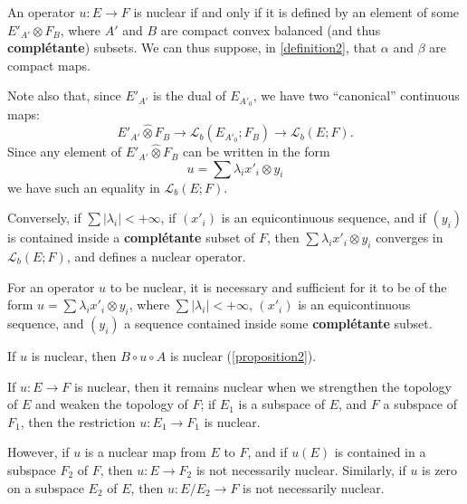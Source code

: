 \documentclass{article}
\theoremstyle{plain}
\newenvironment{proposition}[1]
    {\renewcommand\theinnercustomproposition{#1}\innercustomproposition}
    {\endinnercustomproposition}
\newenvironment{corollary}[1]
    {\renewcommand\theinnercustomcorollary{#1}\innercustomcorollary}
    {\endinnercustomcorollary}
\theoremstyle{definition}
\newcommand{\LL}{\mathcal{L}}
\newcommand{\cotimes}{\widehat{\otimes}}
\newcommand{\oldpage}[1]{\marginpar{\footnotesize$\Big\vert$ \textit{p.~#1}}}
\begin{document}
\begin{proposition}{3}
\label{proposition3}
  An operator $u\colon E\to F$ is nuclear if and only if it is defined by an element of some $E'_{A'}\otimes F_B$, where $A'$ and $B$ are compact convex balanced (and thus \textbf{compl\'{e}tante}) subsets.
  We can thus suppose, in \cref{definition2}, that $\alpha$ and $\beta$ are compact maps.
\end{proposition}

Note also that, since $E'_{A'}$ is the dual of $E_{A'_0}$, we have two ``canonical'' continuous maps:
\[
  E'_{A'}\cotimes F_B \to \LL_b(E_{A'_0};F_B) \to \LL_b(E;F).
\]
Since any element of $E'_{A'}\cotimes F_B$ can be written in the form
\[
  u = \sum\lambda_i x'_i\otimes y_i
\]
\oldpage{5}
we have such an equality in $\LL_b(E;F)$.

Conversely, if $\sum|\lambda_i|<+\infty$, if $(x'_i)$ is an equicontinuous sequence, and if $(y_i)$ is contained inside a \textbf{compl\'{e}tante} subset of $F$, then $\sum\lambda_i x'_i\otimes y_i$ converges in $\LL_b(E;F)$, and defines a nuclear operator.

\begin{proposition}{4}
\label{proposition4}
  For an operator $u$ to be nuclear, it is necessary and sufficient for it to be of the form $u=\sum\lambda_i x'_i\otimes y_i$, where $\sum|\lambda_i|<+\infty$, $(x'_i)$ is an equicontinuous sequence, and $(y_i)$ a sequence contained inside some \textbf{compl\'{e}tante} subset.
\end{proposition}

\begin{proposition}{5}
\label{proposition5}
  If $u$ is nuclear, then $B\circ u\circ A$ is nuclear (\cref{proposition2}).
\end{proposition}

\begin{corollary}{1}
\label{corollary-5}
  If $u\colon E\to F$ is nuclear, then it remains nuclear when we strengthen the topology of $E$ and weaken the topology of $F$;
  if $E_1$ is a subspace of $E$, and $F$ a subspace of $F_1$, then the restriction $u\colon E_1\to F_1$ is nuclear.
\end{corollary}

However, if $u$ is a nuclear map from $E$ to $F$, and if $u(E)$ is contained in a subspace $F_2$ of $F$, then $u\colon E\to F_2$ is not necessarily nuclear.
Similarly, if $u$ is zero on a subspace $E_2$ of $E$, then $u\colon E/E_2\to F$ is not necessarily nuclear.
\end{document}
